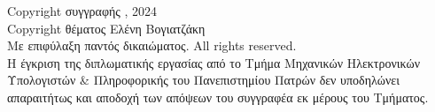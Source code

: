 \scriptsize

\vspace*{\fill}
\textcopyright{} Copyright συγγραφής \thesisauthor, 2024\\[2pt]
\textcopyright{} Copyright θέματος Ελένη Βογιατζάκη\\[2pt]
Με επιφύλαξη παντός δικαιώματος.
All rights reserved.\\[2pt]
Η έγκριση της διπλωματικής εργασίας από το Τμήμα Μηχανικών Ηλεκτρονικών Υπολογιστών \& Πληροφορικής του Πανεπιστημίου Πατρών δεν υποδηλώνει απαραιτήτως και αποδοχή των απόψεων του συγγραφέα εκ μέρους του Τμήματος.

\normalsize

\pagebreak
